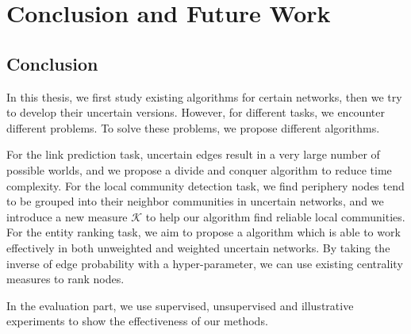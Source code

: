 \documentclass[\main/thesis.tex]{subfiles}
\begin{document}
\chapter{Conclusion and Future Work}

\section{Conclusion}
In this thesis, we first study existing algorithms for certain networks, then we try to develop their uncertain versions. However, for different tasks, we encounter different problems. To solve these problems, we propose different algorithms. 

For the link prediction task, uncertain edges result in a very large number of possible worlds, and we propose a divide and conquer algorithm to reduce time complexity. For the local community detection task, we find periphery nodes tend to be grouped into their neighbor communities in uncertain networks, and we introduce a new measure $\mathcal{K}$ to help our algorithm find reliable local communities. For the entity ranking task, we aim to propose a algorithm which is able to work effectively in both unweighted and weighted uncertain networks. By taking the inverse of edge probability with a hyper-parameter, we can use existing centrality measures to rank nodes.

In the evaluation part, we use supervised, unsupervised and illustrative experiments to show the effectiveness of our methods.


\end{document}
